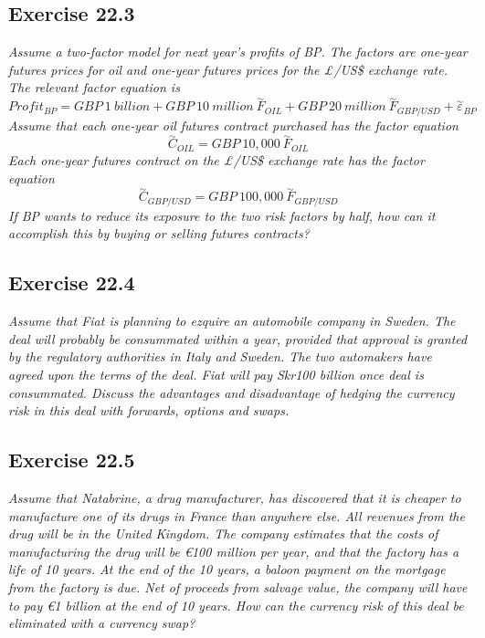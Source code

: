 \documentclass[]{book}
\newcommand{\euro}{€}
\theoremstyle{definition}
\theoremstyle{definition}
\theoremstyle{remark}
\begin{document}
\subsection{Exercise 22.3}\label{exercise-22.3}

\emph{Assume a two-factor model for next year's profits of BP. The
factors are one-year futures prices for oil and one-year futures prices
for the £/US\$ exchange rate. The relevant factor equation is}
\citep[p.752]{book}
\[Profit_{BP}=GBP \ 1 \ billion+GBP \ 10 \ million \ \overset{\sim}{F}_{OIL}+GBP \ 20 \ million \ \overset{\sim}{F}_{GBP/USD}+\overset{\sim}{\varepsilon}_{BP}\]
\emph{Assume that each one-year oil futures contract purchased has the
factor equation} \citep[p.752]{book}
\[\overset{\sim}{C}_{OIL}=GBP \ 10,000 \ \overset{\sim}{F}_{OIL}\]
\emph{Each one-year futures contract on the £/US\$ exchange rate has the
factor equation} \citep[p.752]{book}
\[\overset{\sim}{C}_{GBP/USD}=GBP \ 100,000 \ \overset{\sim}{F}_{GBP/USD}\]
\emph{If BP wants to reduce its exposure to the two risk factors by
half, how can it accomplish this by buying or selling futures
contracts?} \citep[p.752]{book}

\subsection{Exercise 22.4}\label{exercise-22.4}

\emph{Assume that Fiat is planning to ezquire an automobile company in
Sweden. The deal will probably be consummated within a year, provided
that approval is granted by the regulatory authorities in Italy and
Sweden. The two automakers have agreed upon the terms of the deal. Fiat
will pay Skr100 billion once deal is consummated. Discuss the advantages
and disadvantage of hedging the currency risk in this deal with
forwards, options and swaps.} \citep[p.752]{book}

\subsection{Exercise 22.5}\label{exercise-22.5}

\emph{Assume that Natabrine, a drug manufacturer, has discovered that it
is cheaper to manufacture one of its drugs in France than anywhere else.
All revenues from the drug will be in the United Kingdom. The company
estimates that the costs of manufacturing the drug will be \euro{}100
million per year, and that the factory has a life of 10 years. At the
end of the 10 years, a baloon payment on the mortgage from the factory
is due. Net of proceeds from salvage value, the company will have to pay
\euro{}1 billion at the end of 10 years. How can the currency risk of
this deal be eliminated with a currency swap?} \citep[p.752]{book}
\end{document}
